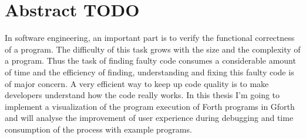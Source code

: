 \chapter*{Abstract TODO}

In software engineering, an important part is to verify the functional correctness of a program. The difficulty of this task grows with the size and the complexity of a program. Thus the task of finding faulty code consumes a considerable amount of time and the efficiency of finding, understanding and fixing this faulty code is of major concern. A very efficient way to keep up code quality is to make developers understand how the code really works. In this thesis I'm going to implement a visualization of the program execution of Forth programs in Gforth and will analyse the improvement of user experience during debugging and time consumption of the process with example programs.